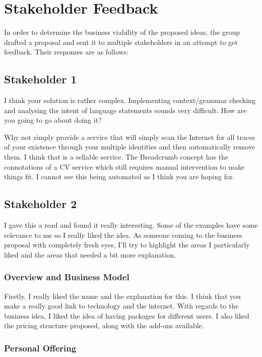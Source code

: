 \section{Stakeholder Feedback}

  In order to determine the business viability of the proposed ideas, the group drafted a proposal and sent it to multiple stakeholders in an attempt to get feedback. Their responses are as follows:

  \subsection{Stakeholder 1}

    I think your solution is rather complex. Implementing context/grammar checking and analysing the intent of language statements sounds very difficult. How are you going to go about doing it?

    Why not simply provide a service that will simply scan the Internet for all traces of your existence through your multiple identities and then automatically remove them. I think that is a sellable service. The Breadcrumb concept has the connotations of a CV service which still requires manual intervention to make things fit. I cannot see this being automated as I think you are hoping for.

  \subsection{Stakeholder 2}

    I gave this a read and found it really interesting. Some of the examples have some relevance to me so I really liked the idea. As someone coming to the business proposal with completely fresh eyes, I'll try to highlight the areas I particularly liked and the areas that needed a bit more explanation.

    \subsubsection{Overview and Business Model}

      Firstly, I really liked the name and the explanation for this. I think that you make a really good link to technology and the internet. With regards to the business idea, I liked the idea of having packages for different users. I also liked the pricing structure proposed, along with the add-ons available.

    \subsubsection{Personal Offering}

